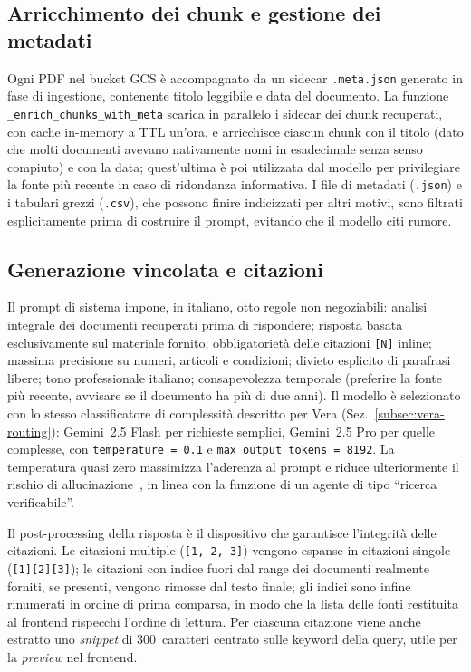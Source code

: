 \subsection{Arricchimento dei chunk e gestione dei metadati}
\label{subsec:coopolicy-meta}

Ogni PDF nel bucket GCS è accompagnato da un sidecar \texttt{.meta.json}
generato in fase di ingestione, contenente titolo leggibile e data del
documento. La funzione \texttt{\_enrich\_chunks\_with\_meta} scarica in
parallelo i sidecar dei chunk recuperati, con cache in-memory a TTL
un'ora, e arricchisce ciascun chunk con il titolo (dato che molti documenti avevano 
nativamente nomi in esadecimale senza senso compiuto) e con la
data; quest'ultima è poi utilizzata dal modello per privilegiare la
fonte più recente in caso di ridondanza informativa. I file di metadati
(\texttt{.json}) e i tabulari grezzi (\texttt{.csv}), che possono
finire indicizzati per altri motivi, sono filtrati esplicitamente prima
di costruire il prompt, evitando che il modello citi rumore.

\subsection{Generazione vincolata e citazioni}
\label{subsec:coopolicy-generation}

Il prompt di sistema impone, in italiano, otto regole non negoziabili:
analisi integrale dei documenti recuperati prima di rispondere; risposta
basata esclusivamente sul materiale fornito; obbligatoriet\`a delle
citazioni \texttt{[N]} inline; massima precisione su numeri, articoli e
condizioni; divieto esplicito di parafrasi libere; tono professionale
italiano; consapevolezza temporale (preferire la fonte più recente,
avvisare se il documento ha più di due anni). Il modello è selezionato con
lo stesso classificatore di complessità descritto per Vera
(Sez.~\ref{subsec:vera-routing}): Gemini~2.5 Flash per richieste semplici,
Gemini~2.5 Pro per quelle complesse,
con \texttt{temperature = 0.1} e \texttt{max\_output\_tokens = 8192}. La
temperatura quasi zero massimizza l'aderenza al prompt e riduce
ulteriormente il rischio di allucinazione~\cite{xu2024hallucination}, in
linea con la funzione di un agente di tipo ``ricerca verificabile''.

Il post-processing della risposta è il dispositivo che garantisce
l'integrità delle citazioni. Le citazioni multiple
(\texttt{[1, 2, 3]}) vengono espanse in citazioni singole
(\texttt{[1][2][3]}); le citazioni con indice fuori dal range dei
documenti realmente forniti, se presenti,
vengono rimosse dal testo finale; gli indici sono infine rinumerati
in ordine di prima comparsa, in modo che la lista delle fonti
restituita al frontend rispecchi l'ordine di lettura. Per ciascuna
citazione viene anche estratto uno \emph{snippet} di 300~caratteri
centrato sulle keyword della query, utile per la \emph{preview} nel
frontend.

